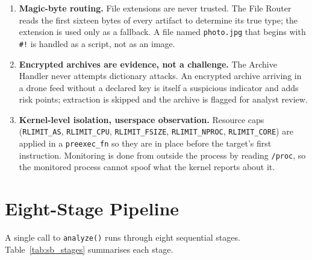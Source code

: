 \documentclass[12pt, a4paper]{report}
\begin{document}
\begin{enumerate}
    \item \textbf{Magic-byte routing.} File extensions are never
          trusted. The File Router reads the first sixteen bytes of
          every artifact to determine its true type; the extension is
          used only as a fallback. A file named \texttt{photo.jpg}
          that begins with \texttt{\#!} is handled as a script, not
          as an image.
    \item \textbf{Encrypted archives are evidence, not a challenge.}
          The Archive Handler never attempts dictionary attacks. An
          encrypted archive arriving in a drone feed without a
          declared key is itself a suspicious indicator and adds risk
          points; extraction is skipped and the archive is flagged for
          analyst review.
    \item \textbf{Kernel-level isolation, userspace observation.}
          Resource caps (\texttt{RLIMIT\_AS}, \texttt{RLIMIT\_CPU},
          \texttt{RLIMIT\_FSIZE}, \texttt{RLIMIT\_NPROC},
          \texttt{RLIMIT\_CORE}) are applied in a \texttt{preexec\_fn}
          so they are in place before the target's first instruction.
          Monitoring is done from outside the process by reading
          \texttt{/proc}, so the monitored process cannot spoof what
          the kernel reports about it.
\end{enumerate}

\section{Eight-Stage Pipeline}

A single call to \texttt{analyze()} runs through eight sequential
stages. Table~\ref{tab:sb_stages} summarises each stage.
\end{document}
